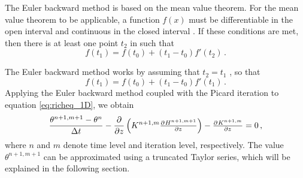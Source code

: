 The Euler backward method is based on the mean value theorem.  For the mean value theorem to be applicable, a function $f(x)$ must be differentiable in the open interval  and continuous in the closed interval  \parencite{Weisstein2017c}.  If these conditions are met, then there is at least one point $t_2$ in  such that
\begin{equation*}
  f(t_1) = f(t_0) + (t_1 - t_0) f'(t_2) \, .
\end{equation*}

The Euler backward method works by assuming that $t_2 = t_1$ \parencite{hairer_solving_2009}, so that
\begin{equation*}
  f(t_1) = f(t_0) + (t_1 - t_0) f'(t_1) \, .
\end{equation*}
Applying the Euler backward method coupled with the Picard iteration to equation \eqref{eq:richeq_1D}, we obtain \parencite{celia_general_1990}
\begin{equation}
  \label{eq:celia_14}
  \frac{\theta^{n+1,m+1} - \theta^n}{\Delta t} - \frac{\partial}{\partial z} \del{ K^{n+1,m}\pd{H^{n+1,m+1}}{z} } - \pd{K^{n+1,m}}{z} = 0 \, ,
\end{equation}
where $n$ and $m$ denote time level and iteration level, respectively.  The value $\theta^{n+1,m+1}$ can be approximated using a truncated Taylor series, which will be explained in the following section.


